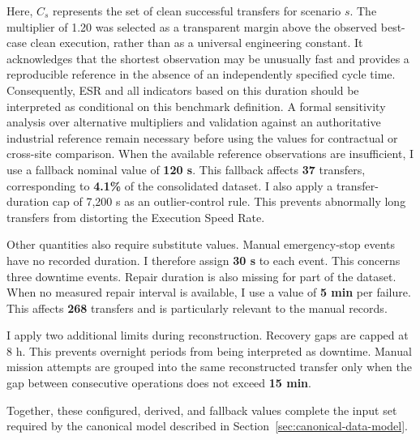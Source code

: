 Here, $C_s$ represents the set of clean successful transfers for scenario $s$. The multiplier of 1.20 was selected as a transparent margin above the observed best-case clean execution, rather than as a universal engineering constant. It acknowledges that the shortest observation may be unusually fast and provides a reproducible reference in the absence of an independently specified cycle time. Consequently, ESR and all indicators based on this duration should be interpreted as conditional on this benchmark definition. A formal sensitivity analysis over alternative multipliers and validation against an authoritative industrial reference remain necessary before using the values for contractual or cross-site comparison. When the available reference observations are insufficient, I use a fallback nominal value of \textbf{120 s}. This fallback affects \textbf{37} transfers, corresponding to \textbf{4.1\%} of the consolidated dataset. I also apply a transfer-duration cap of 7,200 s as an outlier-control rule. This prevents abnormally long transfers from distorting the Execution Speed Rate.

Other quantities also require substitute values. Manual emergency-stop events have no recorded duration. I therefore assign \textbf{30 s} to each event. This concerns three downtime events. Repair duration is also missing for part of the dataset. When no measured repair interval is available, I use a value of \textbf{5 min} per failure. This affects \textbf{268} transfers and is particularly relevant to the manual records.

I apply two additional limits during reconstruction. Recovery gaps are capped at 8 h. This prevents overnight periods from being interpreted as downtime. Manual mission attempts are grouped into the same reconstructed transfer only when the gap between consecutive operations does not exceed \textbf{15 min}.

Together, these configured, derived, and fallback values complete the input set required by the canonical model described in Section~\ref{sec:canonical-data-model}.

